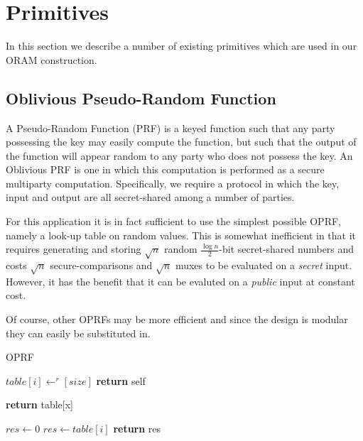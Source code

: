 
\section{Primitives}

In this section we describe a number of existing primitives which are
used in our ORAM construction.

\subsection{Oblivious Pseudo-Random Function}

A Pseudo-Random Function (PRF) is a keyed function such that
any party possessing the key may easily compute the function,
but such that the output of the function will appear random 
to any party who does not possess the key.
An Oblivious PRF is one in which this computation is performed
as a secure multiparty computation.
Specifically, we require a protocol in which the key, input
and output are all secret-shared among a number of parties.

For this application it is in fact sufficient to use the simplest possible
OPRF, namely a look-up table on random values.
This is somewhat inefficient in that it requires generating and storing 
$\sqrt{n}$ random $\frac{\log{n}}{2}$-bit secret-shared numbers
and costs $\sqrt{n}$ secure-comparisons and 
$\sqrt{n}$ muxes to be evaluated on a \emph{secret} input.
However, it has the benefit that it can be evaluted on a
\emph{public} input at constant cost.

Of course, other OPRFs may be more efficient and since the design
is modular they can easily be substituted in.

\begin{algorithm}
\caption{OPRF}
\label{alg:oprf}
\begin{algorithmic}[1]

 
    \State $table[i] \gets^r [size]$
\EndFor
\State \textbf{return} self
\EndProcedure

\State

 
\State \textbf{return} table[x]
\EndProcedure

\State

\State $res \gets 0$
    \State $res \gets table[i]$
    \EndOblivIf
\EndFor
\State \textbf{return} res
\EndProcedure

\end{algorithmic}
\end{algorithm}


